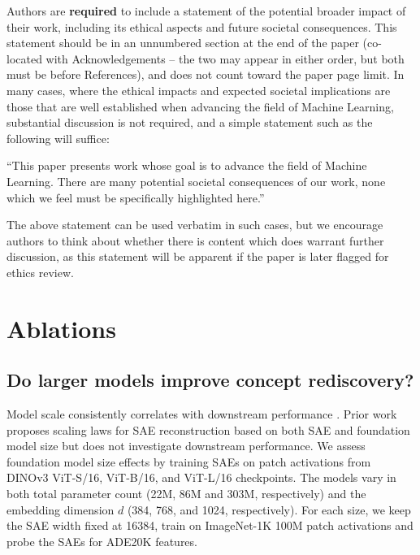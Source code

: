 \documentclass{article}
\newcommand{\sam}[1]{\textbf{\color{blue}[Sam: #1]}}
\newcommand{\jake}[1]{\textbf{\color{green}[Jake: #1]}}
\theoremstyle{plain}
\theoremstyle{definition}
\theoremstyle{remark}
\begin{document}
Authors are \textbf{required} to include a statement of the potential broader
impact of their work, including its ethical aspects and future societal
consequences. This statement should be in an unnumbered section at the end of
the paper (co-located with Acknowledgements -- the two may appear in either
order, but both must be before References), and does not count toward the paper
page limit. In many cases, where the ethical impacts and expected societal
implications are those that are well established when advancing the field of
Machine Learning, substantial discussion is not required, and a simple
statement such as the following will suffice:

``This paper presents work whose goal is to advance the field of Machine
Learning. There are many potential societal consequences of our work, none
which we feel must be specifically highlighted here.''

The above statement can be used verbatim in such cases, but we encourage
authors to think about whether there is content which does warrant further
discussion, as this statement will be apparent if the paper is later flagged
for ethics review.





\newpage
\appendix
\section{Ablations}

\subsection{Do larger models improve concept rediscovery?}\label{sec:ablation-size}
Model scale consistently correlates with downstream performance \citep{kaplan2020scaling,hoffmann2022training}. 
Prior work proposes scaling laws for SAE reconstruction based on both SAE and foundation model size \citep{gao2025scaling} but does not investigate downstream performance.
We assess foundation model size effects by training SAEs on patch activations from DINOv3 ViT-S/16, ViT-B/16, and ViT-L/16 checkpoints.
The models vary in both total parameter count (\num{22}M, \num{86}M and \num{303}M, respectively) and the embedding dimension $d$ (\num{384}, \num{768}, and \num{1024}, respectively).
For each size, we keep the SAE width fixed at \num{16384}, train on ImageNet-1K \num{100}M patch activations and probe the SAEs for ADE20K features.
\end{document}

